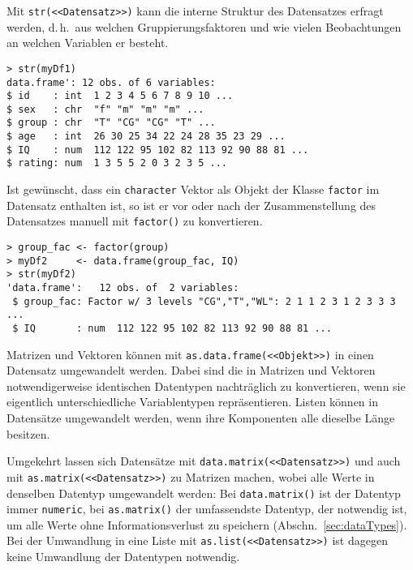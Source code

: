 Mit \lstinline!str(<<Datensatz>>)! kann die interne Struktur des Datensatzes erfragt werden, d.\,h.\ aus welchen Gruppierungsfaktoren und wie vielen Beobachtungen an welchen Variablen er besteht.
\begin{lstlisting}
> str(myDf1)
data.frame': 12 obs. of 6 variables:
$ id    : int  1 2 3 4 5 6 7 8 9 10 ...
$ sex   : chr  "f" "m" "m" "m" ...
$ group : chr  "T" "CG" "CG" "T" ...
$ age   : int  26 30 25 34 22 24 28 35 23 29 ...
$ IQ    : num  112 122 95 102 82 113 92 90 88 81 ...
$ rating: num  1 3 5 5 2 0 3 2 3 5 ...
\end{lstlisting}

Ist gewünscht, dass ein \lstinline!character! Vektor als Objekt der Klasse \lstinline!factor! im Datensatz enthalten ist, so ist er vor oder nach der Zusammenstellung des Datensatzes manuell mit \lstinline!factor()! zu konvertieren.
\begin{lstlisting}
> group_fac <- factor(group)
> myDf2     <- data.frame(group_fac, IQ)
> str(myDf2)
'data.frame':	12 obs. of  2 variables:
 $ group_fac: Factor w/ 3 levels "CG","T","WL": 2 1 1 2 3 1 2 3 3 3 ...
 $ IQ       : num  112 122 95 102 82 113 92 90 88 81 ...
\end{lstlisting}

Matrizen und Vektoren können mit \lstinline!as.data.frame(<<Objekt>>)! in einen Datensatz umgewandelt werden. Dabei sind die in Matrizen und Vektoren notwendigerweise identischen Datentypen nachträglich zu konvertieren, wenn sie eigentlich unterschiedliche Variablentypen repräsentieren. Listen können in Datensätze umgewandelt werden, wenn ihre Komponenten alle dieselbe Länge besitzen.

Umgekehrt lassen sich Datensätze mit \lstinline!data.matrix(<<Datensatz>>)! und auch mit \lstinline!as.matrix(<<Datensatz>>)! zu Matrizen machen, wobei alle Werte in denselben Datentyp umgewandelt werden: Bei \lstinline!data.matrix()! ist der Datentyp immer \lstinline!numeric!, bei \lstinline!as.matrix()! der umfassendste Datentyp, der notwendig ist, um alle Werte ohne Informationsverlust zu speichern (Abschn.\ \ref{sec:dataTypes}). Bei der Umwandlung in eine Liste mit \lstinline!as.list(<<Datensatz>>)! ist dagegen keine Umwandlung der Datentypen notwendig.

